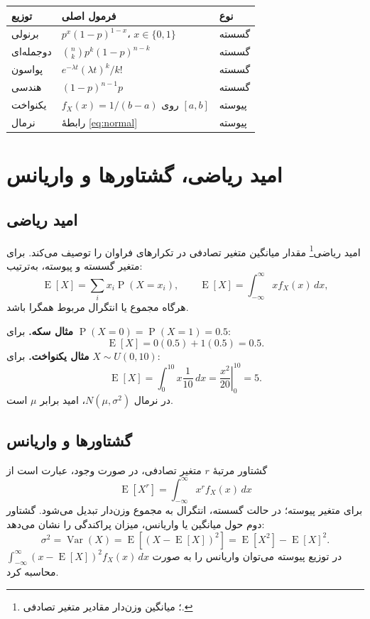 \documentclass[12pt,a4paper,oneside]{book}
\newcommand{\Prob}{\operatorname{P}}
\newcommand{\E}{\operatorname{E}}
\newcommand{\Var}{\operatorname{Var}}
\begin{document}
\begin{center}\small\begin{tabular}{p{34mm}p{83mm}p{21mm}}\toprule
توزیع & فرمول اصلی & نوع \\ \midrule
برنولی & $p^x(1-p)^{1-x}$، $x\in\{0,1\}$ & گسسته \\
دوجمله‌ای & $\binom nk p^k(1-p)^{n-k}$ & گسسته \\
پواسون & $e^{-\lambda t}(\lambda t)^k/k!$ & گسسته \\
هندسی & $(1-p)^{n-1}p$ & گسسته \\
یکنواخت & $f_X(x)=1/(b-a)$ روی $[a,b]$ & پیوسته \\
نرمال & رابطهٔ \eqref{eq:normal} & پیوسته \\ \bottomrule
\end{tabular}\end{center}

\chapter{امید ریاضی، گشتاورها و واریانس}
\section{امید ریاضی}
امید ریاضی\footnote{؛ میانگین وزن‌دار مقادیر متغیر تصادفی.} مقدار میانگین متغیر تصادفی در تکرارهای فراوان را توصیف می‌کند. برای متغیر گسسته و پیوسته، به‌ترتیب:
\begin{equation}\label{eq:expectation}
\E[X]=\sum_i x_i\Prob(X=x_i),
\qquad
\E[X]=\int_{-\infty}^{\infty}x f_X(x)\,dx,
\end{equation}
هرگاه مجموع یا انتگرال مربوط همگرا باشد.

\textbf{مثال سکه.} برای $\Prob(X=0)=\Prob(X=1)=0.5$:
\[\E[X]=0(0.5)+1(0.5)=0.5.\]
\textbf{مثال یکنواخت.} برای $X\sim U(0,10)$:
\[\E[X]=\int_0^{10}x\frac1{10}\,dx=\left.\frac{x^2}{20}\right|_0^{10}=5.\]
در نرمال $N(\mu,\sigma^2)$، امید برابر $\mu$ است.

\section{گشتاورها و واریانس}
گشتاور مرتبهٔ $r$ متغیر تصادفی، در صورت وجود، عبارت است از
\begin{equation}\E[X^r]=\int_{-\infty}^{\infty}x^r f_X(x)\,dx\end{equation}
برای متغیر پیوسته؛ در حالت گسسته، انتگرال به مجموع وزن‌دار تبدیل می‌شود. گشتاور دوم حول میانگین یا واریانس، میزان پراکندگی را نشان می‌دهد:
\begin{equation}\label{eq:variance}
\sigma^2=\Var(X)=\E[(X-\E[X])^2]
=\E[X^2]-\E[X]^2.
\end{equation}
در توزیع پیوسته می‌توان واریانس را به صورت $\int_{-\infty}^{\infty}(x-\E[X])^2f_X(x)\,dx$ محاسبه کرد.
\end{document}
